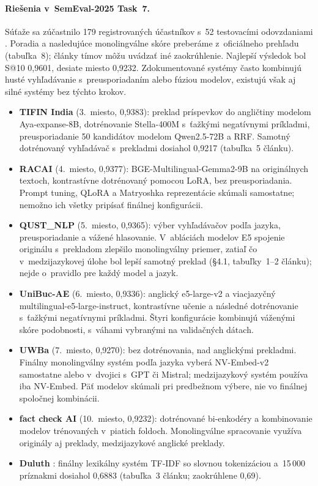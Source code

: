 \documentclass[11pt,a4paper]{article}
\makeatletter
\newcommand{\sat}{S@10}
\makeatother
\begin{document}
\paragraph{Riešenia v~SemEval-2025 Task~7.}
Súťaže sa zúčastnilo 179 registrovaných účastníkov s~52 testovacími odovzdaniami \citep{peng-etal-2025-semeval}.
Poradia a nasledujúce monolingválne skóre preberáme z~oficiálneho prehľadu (tabuľka~8); články tímov môžu uvádzať iné zaokrúhlenie.
Najlepší výsledok bol \sat{} 0{,}9601, desiate miesto 0{,}9232.
Zdokumentované systémy často kombinujú husté vyhľadávanie s~preusporiadaním alebo fúziou modelov, existujú však aj silné systémy bez týchto krokov.
\begin{itemize}
  \item \textbf{TIFIN India} \citep{devadiga-etal-2025-tifin} (3.~miesto, 0{,}9383): preklad príspevkov do angličtiny modelom Aya-expanse-8B, dotrénovanie Stella-400M s~ťažkými negatívnymi príkladmi, preusporiadanie 50 kandidátov modelom Qwen2.5-72B a RRF.
  Samotný dotrénovaný vyhľadávač s~prekladmi dosiahol 0{,}9217 (tabuľka~5 článku).
  \item \textbf{RACAI} \citep{chivereanu-tufis-2025-racai} (4.~miesto, 0{,}9377): BGE-Multilingual-Gemma2-9B na originálnych textoch, kontrastívne dotrénovaný pomocou LoRA, bez preusporiadania.
  Prompt tuning, QLoRA a Matryoshka reprezentácie skúmali samostatne; nemožno ich všetky pripísať finálnej konfigurácii.
  \item \textbf{QUST\_NLP} \citep{liu-etal-2025-qust} (5.~miesto, 0{,}9365): výber vyhľadávačov podľa jazyka, preusporiadanie a vážené hlasovanie.
  V~abláciách modelov E5 spojenie originálu s~prekladom zlepšilo monolingválny priemer, zatiaľ čo v~medzijazykovej úlohe bol lepší samotný preklad (\S4.1, tabuľky~1--2 článku); nejde o~pravidlo pre každý model a jazyk.
  \item \textbf{UniBuc-AE} \citep{enache-2025-unibuc} (6.~miesto, 0{,}9336): anglický e5-large-v2 a viacjazyčný multilingual-e5-large-instruct, kontrastívne učenie a následné dotrénovanie s~ťažkými negatívnymi príkladmi.
  Štyri konfigurácie kombinujú váženými skóre podobnosti, s~váhami vybranými na validačných dátach.
  \item \textbf{UWBa} \citep{lenc-etal-2025-uwba} (7.~miesto, 0{,}9270): bez dotrénovania, nad anglickými prekladmi.
  Finálny monolingválny systém podľa jazyka vyberá NV-Embed-v2 samostatne alebo v~dvojici s~GPT či Mistral; medzijazykový systém používa iba NV-Embed.
  Päť modelov skúmali pri predbežnom výbere, nie vo finálnej spoločnej kombinácii.
  \item \textbf{fact check AI} \citep{rastogi-2025-fact} (10.~miesto, 0{,}9232): dotrénované bi-enkodéry a kombinovanie modelov trénovaných v~piatich foldoch.
  Monolingválne spracovanie využíva originály aj preklady, medzijazykové anglické preklady.
  \item \textbf{Duluth} \citep{syed-pedersen-2025-duluth}: finálny lexikálny systém TF-IDF so slovnou tokenizáciou a~15\,000 príznakmi dosiahol 0{,}6883 (tabuľka~3 článku; zaokrúhlene 0{,}69).
\end{itemize}
\end{document}
